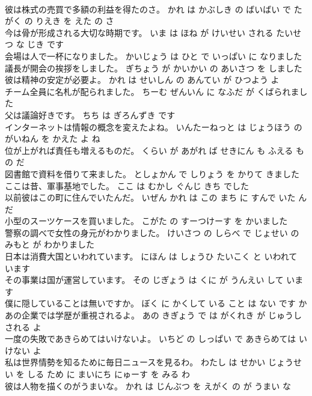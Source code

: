 \documentclass[8pt]{extreport}
\begin{document}
\begin{CJK}{UTF8}{min}
\\	彼は株式の売買で多額の利益を得たのさ。	かれ は かぶしき の ばいばい で たがく の りえき を えた の さ 
\\	今は骨が形成される大切な時期です。	いま は ほね が けいせい される たいせつ な じき です 
\\	会場は人で一杯になりました。	かいじょう は ひと で いっぱい に なりました 
\\	議長が開会の挨拶をしました。	ぎちょう が かいかい の あいさつ を しました 
\\	彼は精神の安定が必要よ。	かれ は せいしん の あんてい が ひつよう よ 
\\	チーム全員に名札が配られました。	ちーむ ぜんいん に なふだ が くばられました 
\\	父は議論好きです。	ちち は ぎろんずき です 
\\	インターネットは情報の概念を変えたよね。	いんたーねっと は じょうほう の がいねん を かえた よ ね 
\\	位が上がれば責任も増えるものだ。	くらい が あがれ ば せきにん も ふえる もの だ 
\\	図書館で資料を借りて来ました。	としょかん で しりょう を かりて きました 
\\	ここは昔、軍事基地でした。	ここ は むかし ぐんじ きち でした 
\\	以前彼はこの町に住んでいたんだ。	いぜん かれ は この まち に すんで いた ん だ 
\\	小型のスーツケースを買いました。	こがた の すーつけーす を かいました 
\\	警察の調べで女性の身元がわかりました。	けいさつ の しらべ で じょせい の みもと が わかりました 
\\	日本は消費大国といわれています。	にほん は しょうひ たいこく と いわれて います 
\\	その事業は国が運営しています。	その じぎょう は くに が うんえい して います 
\\	僕に隠していることは無いですか。	ぼく に かくして いる こと は ない です か 
\\	あの企業では学歴が重視されるよ。	あの きぎょう で は がくれき が じゅうし される よ 
\\	一度の失敗であきらめてはいけないよ。	いちど の しっぱい で あきらめては いけない よ 
\\	私は世界情勢を知るために毎日ニュースを見るわ。	わたし は せかい じょうせい を しる ため に まいにち にゅーす を みる わ 
\\	彼は人物を描くのがうまいな。	かれ は じんぶつ を えがく の が うまい な 

\end{CJK}
\end{document}

